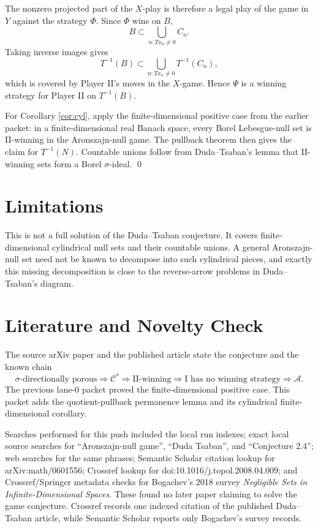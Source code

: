 \documentclass[11pt]{article}
\begin{document}
The nonzero projected part of the \(X\)-play is therefore a legal play of the
game in \(Y\) against the strategy \(\Phi\).  Since \(\Phi\) wins on \(B\),
\[
        B\subset \bigcup_{n:T x_n\ne0} C_n.
\]
Taking inverse images gives
\[
        T^{-1}(B)\subset \bigcup_{n:T x_n\ne0} T^{-1}(C_n),
\]
which is covered by Player II's moves in the \(X\)-game.  Hence \(\Psi\) is a
winning strategy for Player II on \(T^{-1}(B)\).

For Corollary \ref{cor:cyl}, apply the finite-dimensional positive case from
the earlier packet: in a finite-dimensional real Banach space, every Borel
Lebesgue-null set is II-winning in the Aronszajn-null game.  The pullback
theorem then gives the claim for \(T^{-1}(N)\).  Countable unions follow from
Duda--Tsaban's lemma that II-winning sets form a Borel \(\sigma\)-ideal.
\qed

\section*{Limitations}

This is not a full solution of the Duda--Tsaban conjecture.  It covers
finite-dimensional cylindrical null sets and their countable unions.  A
general Aronszajn-null set need not be known to decompose into such
cylindrical pieces, and exactly this missing decomposition is close to the
reverse-arrow problems in Duda--Tsaban's diagram.

\section*{Literature and Novelty Check}

The source arXiv paper and the published article state the conjecture and the
known chain
\[
\sigma\text{-directionally porous}
\Longrightarrow \mathcal C^*
\Longrightarrow \text{II-winning}
\Longrightarrow \text{I has no winning strategy}
\Longrightarrow \mathcal A.
\]
The previous lane-0 packet proved the finite-dimensional positive case.  This
packet adds the quotient-pullback permanence lemma and its cylindrical
finite-dimensional corollary.

Searches performed for this push included the local run indexes; exact local
source searches for ``Aronszajn-null game'', ``Duda Tsaban'', and
``Conjecture 2.4''; web searches for the same phrases; Semantic Scholar
citation lookup for arXiv:math/0601556; Crossref lookup for
doi:10.1016/j.topol.2008.04.009; and Crossref/Springer metadata checks for
Bogachev's 2018 survey \emph{Negligible Sets in Infinite-Dimensional Spaces}.
These found no later paper claiming to solve the game conjecture.  Crossref
records one indexed citation of the published Duda--Tsaban article, while
Semantic Scholar reports only Bogachev's survey records.
\end{document}
